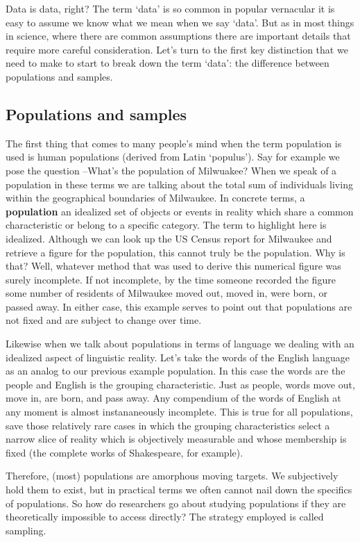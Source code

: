 \documentclass[
  letterpaper,
  krantz1]{latex/krantz-mod}
\theoremstyle{definition}
\theoremstyle{definition}
\theoremstyle{remark}
\begin{document}
Data is data, right? The term `data' is so common in popular vernacular
it is easy to assume we know what we mean when we say `data'. But as in
most things in science, where there are common assumptions there are
important details that require more careful consideration. Let's turn to
the first key distinction that we need to make to start to break down
the term `data': the difference between populations and samples.

\subsection{Populations and samples}\label{populations-and-samples}

The first thing that comes to many people's mind when the term
population is used is human populations (derived from Latin `populus').
Say for example we pose the question --What's the population of
Milwuakee? When we speak of a population in these terms we are talking
about the total sum of individuals living within the geographical
boundaries of Milwaukee. In concrete terms, a
\textbf{population} an idealized set of objects or
events in reality which share a common characteristic or belong to a
specific category. The term to highlight here is idealized. Although we
can look up the US Census report for Milwaukee and retrieve a figure for
the population, this cannot truly be the population. Why is that? Well,
whatever method that was used to derive this numerical figure was surely
incomplete. If not incomplete, by the time someone recorded the figure
some number of residents of Milwaukee moved out, moved in, were born, or
passed away. In either case, this example serves to point out that
populations are not fixed and are subject to change over time.

Likewise when we talk about populations in terms of language we dealing
with an idealized aspect of linguistic reality. Let's take the words of
the English language as an analog to our previous example population. In
this case the words are the people and English is the grouping
characteristic. Just as people, words move out, move in, are born, and
pass away. Any compendium of the words of English at any moment is
almost instananeously incomplete. This is true for all populations, save
those relatively rare cases in which the grouping characteristics select
a narrow slice of reality which is objectively measurable and whose
membership is fixed (the complete works of Shakespeare, for example).

Therefore, (most) populations are amorphous moving targets. We
subjectively hold them to exist, but in practical terms we often cannot
nail down the specifics of populations. So how do researchers go about
studying populations if they are theoretically impossible to access
directly? The strategy employed is called sampling.
\end{document}
